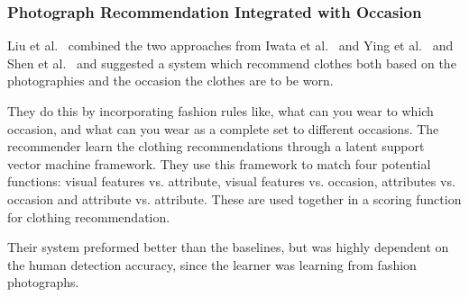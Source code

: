 \subsubsection{Photograph Recommendation Integrated with Occasion} %
\label{par:photograph_recommendation_integrated_with_occasion}
    Liu et al.~\cite{Liu:2012:HMC:2393347.2393433} combined the two approaches from Iwata et al.~\cite{Iwata:2011} and Ying et al.~\cite{Ying2011} and Shen et al.~\cite{Shen:2007:AIG:1216295.1216368} and suggested a system which recommend clothes both based on the photographies and the occasion the clothes are to be worn.

    They do this by incorporating fashion rules like, what can you wear to which occasion, and what can you wear as a complete set to different occasions.
    The recommender learn the clothing recommendations through a latent support vector machine framework.
    They use this framework to match four potential functions: visual features vs. attribute, visual features vs. occasion, attributes vs. occasion and attribute vs. attribute.
    These are used together in a scoring function for clothing recommendation.

    Their system preformed better than the baselines, but was highly dependent on the human detection accuracy, since the learner was learning from fashion photographs.
